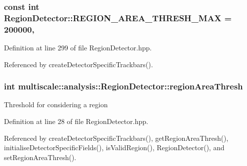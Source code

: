 \hypertarget{classmultiscale_1_1analysis_1_1RegionDetector_a8a301bd841d376448aff4a0c4d0a1485}{
\subsubsection[{R\-E\-G\-I\-O\-N\-\_\-\-A\-R\-E\-A\-\_\-\-T\-H\-R\-E\-S\-H\-\_\-\-M\-A\-X}]{\setlength{\rightskip}{0pt plus 5cm}const int Region\-Detector\-::\-R\-E\-G\-I\-O\-N\-\_\-\-A\-R\-E\-A\-\_\-\-T\-H\-R\-E\-S\-H\-\_\-\-M\-A\-X = 200000\hspace{0.3cm}{\ttfamily [static]}, {\ttfamily [private]}}}\label{classmultiscale_1_1analysis_1_1RegionDetector_a8a301bd841d376448aff4a0c4d0a1485}


Definition at line 299 of file Region\-Detector.\-hpp.



Referenced by create\-Detector\-Specific\-Trackbars().

\hypertarget{classmultiscale_1_1analysis_1_1RegionDetector_a1f637073a3d946d000dceed01412f19a}{
\subsubsection[{region\-Area\-Thresh}]{\setlength{\rightskip}{0pt plus 5cm}int multiscale\-::analysis\-::\-Region\-Detector\-::region\-Area\-Thresh\hspace{0.3cm}{\ttfamily [private]}}}\label{classmultiscale_1_1analysis_1_1RegionDetector_a1f637073a3d946d000dceed01412f19a}
Threshold for considering a region 

Definition at line 28 of file Region\-Detector.\-hpp.



Referenced by create\-Detector\-Specific\-Trackbars(), get\-Region\-Area\-Thresh(), initialise\-Detector\-Specific\-Fields(), is\-Valid\-Region(), Region\-Detector(), and set\-Region\-Area\-Thresh().


